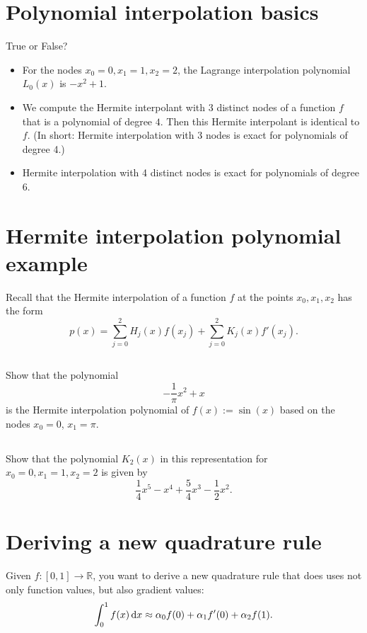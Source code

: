 \documentclass[11pt,letterpaper]{article}
\begin{document}
\section{Polynomial interpolation basics}
True or False?
\begin{itemize}
\item For the nodes $x_0=0, x_1=1, x_2= 2$, the
  Lagrange interpolation polynomial $L_0(x)$ is $-x^2 + 1$.
\item We compute the Hermite interpolant with 3 distinct nodes of
  a function $f$ that is a polynomial of degree $4$. Then this
  Hermite interpolant is identical to $f$. (In short: Hermite
  interpolation with 3 nodes is exact for polynomials of degree 4.)
\item Hermite interpolation with 4 distinct nodes is exact for
  polynomials of degree 6.
\end{itemize}
  
\section{Hermite interpolation polynomial example}
Recall that the Hermite interpolation of a function $f$ at the points $x_0,x_1,x_2$ has the form 
$$p(x) = \sum_{j=0}^2H_j(x)f(x_j)
+ \sum_{j=0}^2K_j(x)f'(x_j).$$ 
  
\subsection{}
Show that the polynomial
$$ -\frac{1}{\pi}x^2 + x$$ 
is the Hermite interpolation polynomial of $f(x):=\sin(x)$ based on the nodes $x_0=0$, $x_1=\pi$.
  
\subsection{}
Show that the polynomial $K_2(x)$ in
this representation for $x_0=0,x_1=1,x_2=2$ is given by
$$
\frac{1}{4}x^5 - x^4 + \frac{5}{4}x^3 - \frac{1}{2}x^2.
$$

\newpage
\section{Deriving a new quadrature rule}
Given $f:[0,1]\rightarrow \mathbb{R}$, you want to derive a new
  quadrature rule that does uses not only function values, but also
  gradient values:
\begin{align}
    \int_0^1 f(x)\,\mathrm{d} x \approx \alpha_0 f(0) + \alpha_1 f'(0) + \alpha_2 f(1). \label{eq:11_3a}
\end{align}
  
\end{document}
